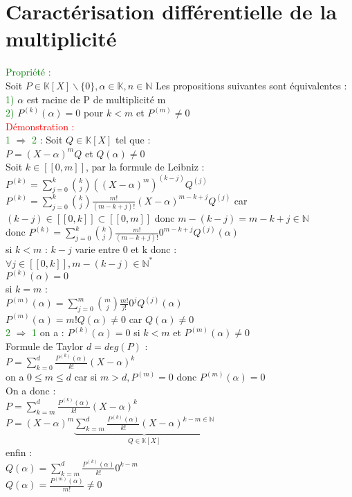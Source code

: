 \documentclass{article}
\begin{document}
\section{Caractérisation différentielle de la multiplicité}
\textcolor{green}{Propriété :} \\
Soit $P \in \mathbb K [X] \backslash \lbrace 0 \rbrace, \alpha \in \mathbb K, n \in \mathbb N$ Les propositions suivantes sont équivalentes : \\
\textcolor{green}{1)} $\alpha$ est racine de P de multiplicité m \\
\textcolor{green}{2)} $P^{(k)}(\alpha)=0$ pour $k<m$ et $P^{(m)}\neq 0$ \\
\textcolor{red}{Démonstration :} \\
\textcolor{green}{1} $\Rightarrow$ \textcolor{green}{2} : Soit $Q \in \mathbb K [X]$ tel que : \\
$P=(X-\alpha)^mQ$ et $Q(\alpha)\neq0$ \\
Soit $k\in [[0,m]]$, par la formule de Leibniz : \\
$P^{(k)}=\sum_{j=0}^k \binom{k}{j}((X- \alpha)^m)^{(k-j)}Q^{(j)}$ \\
$P^{(k)}=\sum_{j=0}^k \binom{k}{j} \frac{m!}{(m-k+j)!}(X- \alpha)^{m-k+j}Q^{(j)}$ car $(k-j) \in [[0,k]] \subset [[0,m]]$ donc $m-(k-j)=m-k+j \in \mathbb N$ \\
donc $P^{(k)}=\sum_{j=0}^k \binom{k}{j} \frac{m!}{(m-k+j)!}0^{m-k+j}Q^{(j)}(\alpha)$ \\
si $k<m$ : $k-j$ varie entre 0 et k donc : \\
$\forall j \in [[0,k]], m-(k-j) \in \mathbb N^*$ \\
$P^{(k)}(\alpha)=0$ \\
si $k=m$ : \\
$P^{(m)}(\alpha)=\sum_{j=0}^m \binom{m}{j} \frac{m!}{j!}0^j Q^{(j)}(\alpha)$ \\
$P^{(m)}(\alpha)=m! Q(\alpha) \neq 0$ car $Q(\alpha) \neq 0$ \\
\textcolor{green}{2} $\Rightarrow$ \textcolor{green}{1} on a : $P^{(k)}(\alpha)=0$ si $k<m$ et $P^{(m)}(\alpha)\neq 0$ \\
Formule de Taylor $d=deg(P)$ : \\
$P=\sum_{k=0}^d \frac{P^{(k)}(\alpha)}{k!}(X-\alpha)^k$ \\
on a $0 \leq m \leq d$ car si $m>d,P^{(m)}=0$ donc $P^{(m)}(\alpha)=0$ \\
On a donc : \\
$P=\sum_{k=m}^d \frac{P^{(k)}(\alpha)}{k!}(X-\alpha)^k$ \\
$P=(X-\alpha)^m\underbrace{\sum_{k=m}^d \frac{P^{(k)}(\alpha)}{k!}(X-\alpha)^{k-m \in \mathbb N}}_{Q \in \mathbb K[X]}$ \\
enfin : \\
$Q(\alpha)=\sum_{k=m}^d\frac{P^{(k)}(\alpha)}{k!}0^{k-m} $ \\
$Q(\alpha)=\frac{P^{(m)}(\alpha)}{m!} \neq 0$
\end{document}
